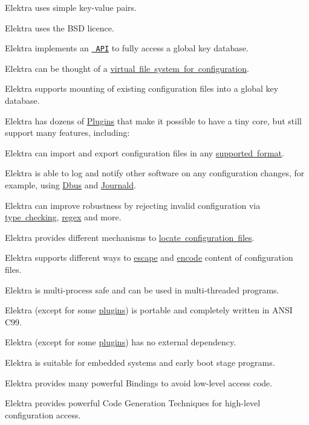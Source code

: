 \begin{DoxyItemize}
\item Elektra uses simple key-\/value pairs.
\item Elektra uses the B\+SD licence.
\item Elektra implements an \href{https://doc.libelektra.org/api/latest/html/}{\texttt{ A\+PI}} to fully access a global key database.
\item Elektra can be thought of a \mbox{\hyperlink{doc_BIGPICTURE_md}{virtual file system for configuration}}.
\item Elektra supports mounting of existing configuration files into a global key database.
\item Elektra has dozens of \mbox{\hyperlink{src_plugins_README_md}{Plugins}} that make it possible to have a tiny core, but still support many features, including\+:
\begin{DoxyItemize}
\item Elektra can import and export configuration files in any \mbox{\hyperlink{src_plugins_README_md}{supported format}}.
\item Elektra is able to log and notify other software on any configuration changes, for example, using \mbox{\hyperlink{autotoc_md162_src_plugins_dbus_README_md}{Dbus}} and \mbox{\hyperlink{autotoc_md351_src_plugins_journald_README_md}{Journald}}.
\item Elektra can improve robustness by rejecting invalid configuration via \mbox{\hyperlink{autotoc_md695_src_plugins_type_README_md}{type checking}}, \mbox{\hyperlink{autotoc_md710_src_plugins_validation_README_md}{regex}} and more.
\item Elektra provides different mechanisms to \mbox{\hyperlink{autotoc_md618_src_plugins_resolver_README_md}{locate configuration files}}.
\item Elektra supports different ways to \mbox{\hyperlink{autotoc_md78_src_plugins_ccode_README_md}{escape}} and \mbox{\hyperlink{autotoc_md285_src_plugins_iconv_README_md}{encode}} content of configuration files.
\end{DoxyItemize}
\item Elektra is multi-\/process safe and can be used in multi-\/threaded programs.
\item Elektra (except for some \mbox{\hyperlink{src_plugins_README_md}{plugins}}) is portable and completely written in A\+N\+SI C99.
\item Elektra (except for some \mbox{\hyperlink{src_plugins_README_md}{plugins}}) has no external dependency.
\item Elektra is suitable for embedded systems and early boot stage programs.
\item Elektra provides many powerful Bindings to avoid low-\/level access code.
\item Elektra provides powerful Code Generation Techniques for high-\/level configuration access.
\end{DoxyItemize}

